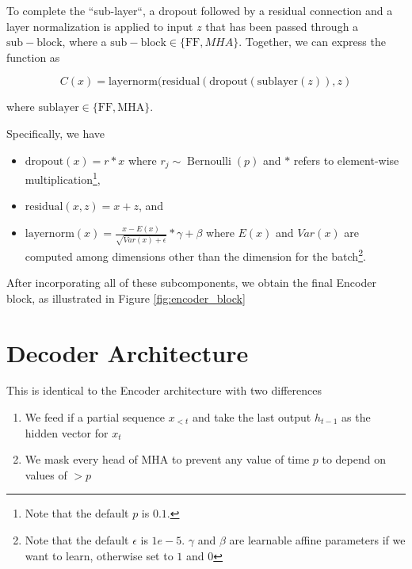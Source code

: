 


To complete the ``sub-layer``, a dropout followed by a residual connection and a layer normalization is applied to input $z$ that has been passed through a $\mathrm{sub-block}$, where a $\mathrm{sub-block} \in \{\mathrm{FF}, MHA\}$. Together, we can express the function as

\begin{equation}
C(x) = \mathrm{layernorm}(\mathrm{residual}(\mathrm{dropout}(\mathrm{sublayer}(z)), z)
\end{equation}

where $\mathrm{sublayer} \in \{\mathrm{FF}, \mathrm{MHA}\}$.


Specifically, we have
\begin{itemize}
    \item $\mathrm{dropout}(x) = r * x$ where $ r_j \sim \operatorname{Bernoulli}(p)$ and $*$ refers to element-wise multiplication\footnote{Note that the default $p$ is $0.1$.},
    \item $\mathrm{residual}(x, z) = x + z$, and 
    \item $\mathrm{layernorm}(x) = \frac{x-E(x)}{\sqrt{Var(x)+\epsilon}}*\gamma + \beta$ where $E(x)$ and $Var(x)$ are computed among dimensions other than the dimension for the batch\footnote{Note that the default $\epsilon$ is $1e-5$. $\gamma$ and $\beta$ are learnable affine parameters if we want to learn, otherwise set to $1$ and $0$}.
\end{itemize}

After incorporating all of these subcomponents, we obtain the final Encoder block, as illustrated in Figure \ref{fig:encoder_block}

\section{Decoder Architecture}\label{sec:dec}

This is identical to the Encoder architecture with two differences

\begin{enumerate}
    \item We feed if a partial sequence $x_{<t}$ and take the last output $h_{t-1}$ as the hidden vector for $x_t$
    \item We mask every head of $\mathrm{MHA}$ to prevent any value of time $p$ to depend on values of $>p$
\end{enumerate}

